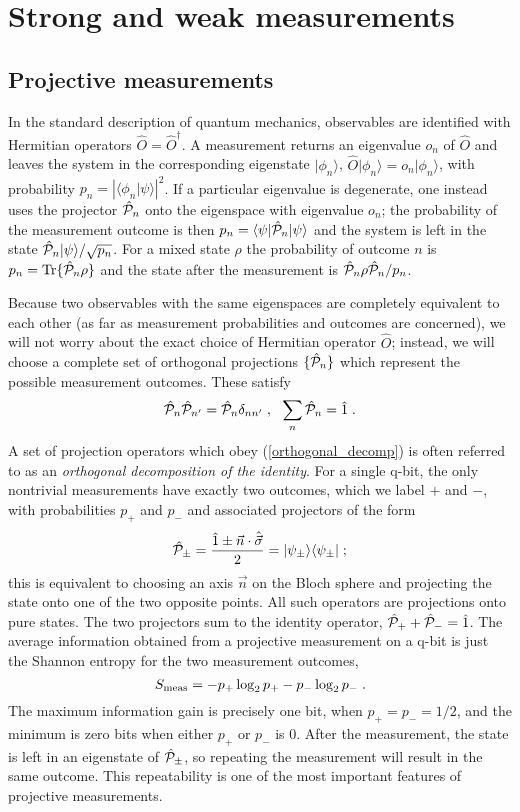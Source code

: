 \documentclass[12pt]{article}
\def\bra#1{{\langle #1 |}}
\def\ket#1{{| #1 \rangle}}
\def\bracket#1#2{{\langle #1 | #2 \rangle}}
\def\svec{{\hat{\vec\sigma}}}
\def\nvec{{\vec n}}
\def\id{{\hat 1}}
\def\tr{{\rm Tr}}
\def\O{{\hat O}}
\def\Odag{{\hat O^\dagger}}
\def\P{{\hat{\cal P}}}
\begin{document}
\section{Strong and weak measurements}

\subsection{Projective measurements}

In the standard description of quantum mechanics, observables are identified
with Hermitian operators $\O=\Odag$.  A measurement returns an eigenvalue
$o_n$ of $\O$ and leaves the system in the corresponding eigenstate
$\ket{\phi_n}$, $\O\ket{\phi_n}=o_n\ket{\phi_n}$, with probability
$p_n=|\bracket{\phi_n}{\psi}|^2$.  If a particular eigenvalue is degenerate,
one instead uses the projector $\P_n$ onto the eigenspace with eigenvalue
$o_n$; the probability of the measurement outcome is then
$p_n = \bra\psi\P_n\ket\psi$ and the system is left in the state
$\P_n\ket\psi/\sqrt{p_n}$.  For a mixed state $\rho$ the probability of
outcome $n$ is $p_n = \tr\{\P_n\rho\}$ and the state after the measurement
is $\P_n\rho\P_n/p_n$.

Because two observables with the same eigenspaces are completely equivalent
to each other (as far as measurement probabilities and outcomes
are concerned), we will not worry about the exact choice
of Hermitian operator $\O$; instead, we will
choose a complete set of orthogonal projections $\{\P_n\}$ which
represent the possible measurement outcomes.  These satisfy
\begin{equation}
\P_n \P_{n'} = \P_n \delta_{nn'} \;, \ \ \sum_n \P_n = \id \;.
\label{orthogonal_decomp}
\end{equation}
A set of projection operators which obey (\ref{orthogonal_decomp}) is
often referred to as an {\it orthogonal decomposition of the identity}.  For
a single q-bit, the only nontrivial measurements have exactly two outcomes,
which we label $+$ and $-$, with probabilities $p_+$ and $p_-$ and
associated projectors of the form
\begin{equation}
\P_\pm = { \id \pm \nvec\cdot\svec \over 2 }
  = \ket{\psi_\pm}\bra{\psi_\pm} \;;
\end{equation}
this is equivalent to choosing an axis $\vec n$
on the Bloch sphere and projecting
the state onto one of the two opposite points.
All such operators are projections onto pure states.
The two projectors sum to the identity operator, $\P_++\P_-=\id$.
The average information obtained from a projective measurement on a q-bit is
just the Shannon entropy for the two measurement outcomes,
\begin{equation}
S_{\rm meas} = - p_+ \log_2 p_+ - p_- \log_2 p_- \;.
\label{shannon}
\end{equation}
The maximum information gain is precisely one bit, when $p_+=p_-=1/2$,
and the minimum is zero bits when either $p_+$ or $p_-$ is 0.
After the measurement, the state is left in an eigenstate of $\P_\pm$, so
repeating the measurement will result in the same outcome.  This repeatability
is one of the most important features of projective measurements.
\end{document}
